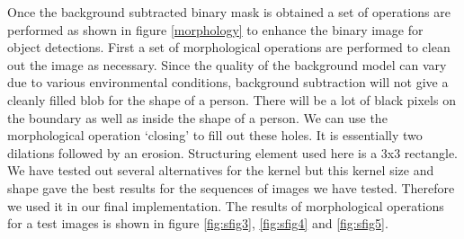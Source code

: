 \documentclass[12pt,a4paper]{report}
\begin{document}
Once the background subtracted binary mask is obtained a set of operations are performed as shown in figure \ref{morphology} to enhance the binary image for object detections. 
First a set of morphological operations are performed to clean out the image as necessary. Since the quality of the background model can vary due to various environmental conditions, background subtraction will not give a cleanly filled blob for the shape of a person. There will be a lot of black pixels on the boundary as well as inside the shape of a person. We can use the morphological operation ‘closing’ to fill out these holes. It is essentially two dilations followed by an erosion. Structuring element used here is a 3x3 rectangle. We have tested out several alternatives for the kernel but this kernel size and shape gave the best results for the sequences of images we have tested. Therefore we used it in our final implementation. The results of morphological operations for a test images is shown in figure \ref{fig:sfig3}, \ref{fig:sfig4} and \ref{fig:sfig5}.\\
\end{document}
